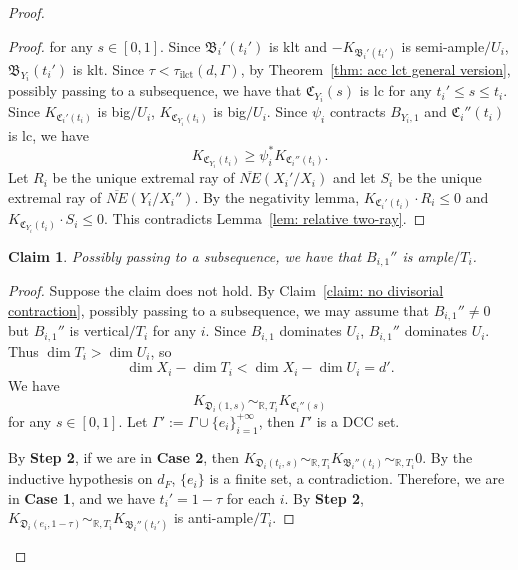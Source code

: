 \documentclass[11pt,reqno]{amsart}
\numberwithin{equation}{section}
\newcommand{\Dd}{{\mathfrak{D}}}
\newcommand{\Cc}{\mathfrak{C}}
\newcommand{\ilct}{\operatorname{ilct}}
\newcommand{\Bb}{{\mathfrak{B}}}
\newcommand{\Ii}{\Gamma}
\newtheorem{claim}[thm]{Claim}
\theoremstyle{definition}
\begin{document}
\begin{proof}
\begin{proof}
    for any $s\in [0,1]$. Since $\Bb_i'(t_i')$ is klt and $-K_{\Bb_i'(t_i')}$ is semi-ample$/U_i$, $\Bb_{Y_i}(t_i')$ is klt. Since $\tau<\tau_{\ilct}(d,\Ii)$, by Theorem~\ref{thm: acc lct general version}, possibly passing to a subsequence, we have that $\Cc_{Y_i}(s)$ is lc for any $t_i'\leq s\leq t_i$. Since $K_{\Cc_i'(t_i)}$ is big$/U_i$, $K_{\Cc_{Y_i}(t_i)}$ is big$/U_i$. Since $\psi_i$ contracts $B_{Y_i,1}$ and $\Cc_i''(t_i)$ is lc, we have
    $$K_{\Cc_{Y_i}(t_i)}\geq \psi_i^*K_{\Cc_i''(t_i)}.$$
    Let $R_i$ be the unique extremal ray of $\overline{NE}(X_i'/X_i)$ and let $S_i$ be the unique extremal ray of $\overline{NE}(Y_i/X_i'')$. By the negativity lemma, $K_{\Cc_i'(t_i)}\cdot R_i\leq 0$ and $K_{\Cc_{Y_i}(t_i)}\cdot S_i\leq 0$. This contradicts Lemma~\ref{lem: relative two-ray}.
\end{proof}

\begin{claim}\label{claim: no trivial case}
    Possibly passing to a subsequence, we have that $B_{i,1}''$ is ample$/T_i$.
\end{claim}
\begin{proof}
Suppose the claim does not hold. By Claim~\ref{claim: no divisorial contraction}, possibly passing to a subsequence, we may assume that $B_{i,1}''\neq0$ but $B_{i,1}''$ is vertical$/T_i$ for any $i$. Since $B_{i,1}$ dominates $U_i$, $B_{i,1}''$ dominates $U_i$. Thus $\dim T_i>\dim U_i$, so $$\dim X_i-\dim T_i<\dim X_i-\dim U_i=d'.$$
We have
$$K_{\Dd_i(1,s)}\sim_{\mathbb R,T_i}K_{\Cc_i''(s)}$$
for any $s\in [0,1]$. Let $\Ii':=\Ii\cup\{e_i\}_{i=1}^{+\infty}$, then $\Ii'$ is a DCC set. 

By \textbf{Step 2}, if we are in \textbf{Case 2}, then $K_{\Dd_i(t_i,s)}\sim_{\mathbb R,T_i}K_{\Bb_i''(t_i)}\sim_{\mathbb R,T_i}0$. By the inductive hypothesis on $d_F$, $\{e_i\}$ is a finite set, a contradiction. Therefore, we are in \textbf{Case 1}, and we have $t_i'=1-\tau$ for each $i$. By \textbf{Step 2}, $K_{\Dd_i(e_i,1-\tau)}\sim_{\mathbb R,T_i}K_{\Bb_i''(t_i')}$ is anti-ample$/T_i$.


\end{proof}
\end{proof}
\end{document}
